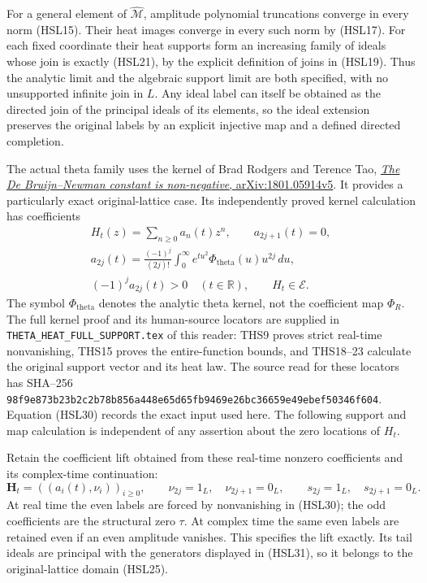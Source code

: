 For a general element of $\widehat{\mathcal M}$, amplitude
polynomial truncations converge in every norm (HSL15).
Their heat images converge in every such norm by (HSL17).
For each fixed coordinate their heat supports form an
increasing family of ideals whose join is exactly (HSL21),
by the explicit definition of joins in (HSL19).
Thus the analytic limit and the algebraic support limit
are both specified, with no unsupported infinite join in $L$.
Any ideal label can itself be obtained as the directed join
of the principal ideals of its elements, so the ideal
extension preserves the original labels by an explicit
injective map and a defined directed completion.

The actual theta family uses the kernel of Brad Rodgers and
Terence Tao, \href{https://arxiv.org/abs/1801.05914v5}{\emph{The
De Bruijn--Newman constant is non-negative}, arXiv:1801.05914v5}.
It provides a particularly exact original-lattice case.
Its independently proved kernel
calculation has coefficients
\begin{equation}\tag{HSL30}
 \begin{gathered}
 H_t(z)=\sum_{n\ge0}a_n(t)z^n,\qquad a_{2j+1}(t)=0,\\
 a_{2j}(t)=
 \frac{(-1)^j}{(2j)!}
       \int_0^\infty e^{tu^2}\Phi_{\mathrm{theta}}(u)u^{2j}\,du,\\
 (-1)^j a_{2j}(t)>0\quad(t\in\mathbb R),\qquad H_t\in\mathcal E.
 \end{gathered}
\end{equation}
The symbol $\Phi_{\mathrm{theta}}$ denotes the analytic
theta kernel, not the coefficient map $\Phi_R$.
The full kernel proof and its human-source locators are
supplied in \nolinkurl{THETA_HEAT_FULL_SUPPORT.tex} of this
reader: THS9 proves strict real-time nonvanishing, THS15
proves the entire-function bounds, and THS18--23 calculate
the original support vector and its heat law. The source
read for these locators has SHA--256
\nolinkurl{98f9e873b23b2c2b78b856a448e65d65fb9469e26bc36659e49ebef50346f604}.
Equation (HSL30) records the exact input used here.
The following support and map calculation is independent
of any assertion about the zero locations of $H_t$.

Retain the coefficient lift obtained from these real-time
nonzero coefficients and its complex-time continuation:
\begin{equation}\tag{HSL31}
 \mathbf H_t=
     ((a_i(t),\nu_i))_{i\ge0},\qquad
 \nu_{2j}=1_L,\quad \nu_{2j+1}=0_L,\qquad
 s_{2j}=1_L,\quad s_{2j+1}=0_L.
\end{equation}
At real time the even labels are forced by nonvanishing in
(HSL30); the odd coefficients are the structural zero
$\tau$. At complex time the same even labels are retained
even if an even amplitude vanishes. This specifies the
lift exactly. Its tail ideals are principal with the
generators displayed in (HSL31), so it belongs to the
original-lattice domain (HSL25).


